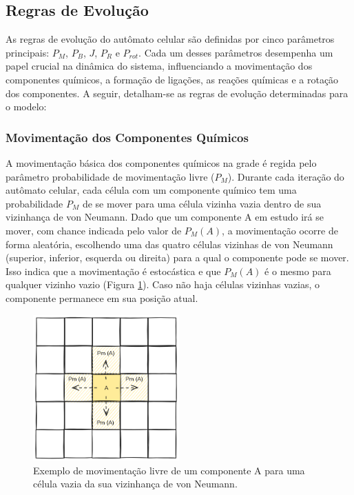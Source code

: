\documentclass[12pt,oneside]{report}
\begin{document}
\subsection{Regras de Evolução}

As regras de evolução do autômato celular são definidas por cinco parâmetros principais: \hyperref[subsubsec:Pm]{$P_M$}, \hyperref[subsubsec:Pb]{$P_B$}, \hyperref[subsubsec:J]{$J$}, \hyperref[subsubsec:Pr]{$P_R$} e \hyperref[subsubsec:Prot]{$P_{rot}$}. Cada um desses parâmetros desempenha um papel crucial na dinâmica do sistema, influenciando a movimentação dos componentes químicos, a formação de ligações, as reações químicas e a rotação dos componentes. A seguir, detalham-se as regras de evolução determinadas para o modelo:

\subsubsection{Movimentação dos Componentes Químicos}
\label{subsubsec:evolucao_movimentacao}

A movimentação básica dos componentes químicos na grade é regida pelo parâmetro probabilidade de movimentação livre (\hyperref[subsubsec:Pm]{$P_M$}). Durante cada iteração do autômato celular, cada célula com um componente químico tem uma probabilidade $P_M$ de se mover para uma célula vizinha vazia dentro de sua vizinhança de von Neumann. Dado que um componente A em estudo irá se mover, com chance indicada pelo valor de $P_M (A)$, a movimentação ocorre de forma aleatória, escolhendo uma das quatro células vizinhas de von Neumann (superior, inferior, esquerda ou direita) para a qual o componente pode se mover. Isso indica que a movimentação é estocástica e que $P_M (A)$ é o mesmo para qualquer vizinho vazio (Figura \ref{fig:evolucao_Pm}). Caso não haja células vizinhas vazias, o componente permanece em sua posição atual.

\begin{figure}[H]
    \centering
    \includegraphics[width=0.5\textwidth]{evolucao_Pm.png}
    \caption{\small Exemplo de movimentação livre de um componente A para uma célula vazia da sua vizinhança de von Neumann.}
    \label{fig:evolucao_Pm}
\end{figure}
\end{document}

